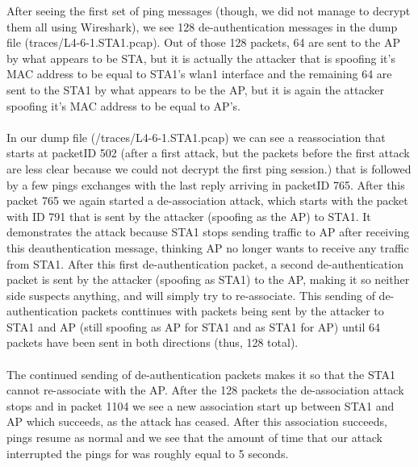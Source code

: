 After seeing the first set of ping messages (though, we did not manage to decrypt them all using Wireshark), we see 128 de-authentication messages in the dump file (traces/L4-6-1.STA1.pcap).
Out of those 128 packets, 64 are sent to the AP by what appears to be STA, but it is actually the attacker that is spoofing it's MAC address to be equal to STA1's wlan1 interface and the
remaining 64 are sent to the STA1 by what appears to be the AP, but it is again the attacker spoofing it's MAC address to be equal to AP's.\\ \\
%
In our dump file (/traces/L4-6-1.STA1.pcap) we can see a reassociation that starts at packetID 502 (after a first attack, but the packets before the first attack are less clear
because we could not decrypt the first ping session.) that is followed by a few pings exchanges with the last reply arriving in packetID 765. After this packet 765 we again started
a de-association attack, which starts with the packet with ID 791 that is sent by the attacker (spoofing as the AP) to STA1. It demonstrates the attack because STA1 stops sending traffic to AP after
receiving this deauthentication message, thinking AP no longer wants to receive any traffic from STA1. After this first de-authentication packet, a second de-authentication packet is sent by
the attacker (spoofing as STA1) to the AP, making it so neither side suspects anything, and will simply try to re-associate. This sending of de-authentication packets conttinues
with packets being sent by the attacker to STA1 and AP (still spoofing as AP for STA1 and as STA1 for AP) until 64 packets have been sent in both directions (thus, 128 total).\\ \\
%
The continued sending of de-authentication packets makes it so that the STA1 cannot re-associate with the AP. After the 128 packets the de-association attack stops and in packet 1104 we see
a new association start up between STA1 and AP which succeeds, as the attack has ceased. After this association succeeds, pings resume as normal and we see that the amount of time that our
attack interrupted the pings for was roughly equal to 5 seconds.
